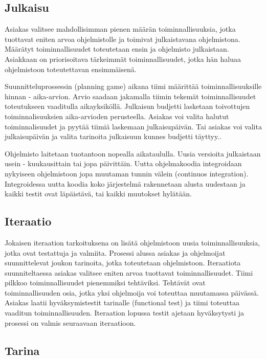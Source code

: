 \documentclass[finnish]{tktltiki2}
\theoremstyle{definition}
\theoremstyle{remark}
\begin{document}
\subsection*{Julkaisu}

Asiakas valitsee mahdollisimman pienen määrän toiminnallisuuksia, jotka tuottavat eniten arvoa ohjelmistolle ja toimivat julkaistavana ohjelmistona. Määrätyt toiminnallisuudet toteutetaan ensin ja ohjelmisto julkaistaan. Asiakkaan on priorisoitava tärkeimmät toiminnallisuudet, jotka hän haluaa ohjelmistoon toteutettavan ensimmäisenä\cite{BEC99}. 

Suunnitteluprossessin (planning game) aikana tiimi määrittää toiminnallisuuksille hinnan - aika-arvion. Arvio saadaan jakamalla tiimin tekemät toiminnallisuudet toteutukseen vaaditulla aikayksiköllä. Julkaisun budjetti lasketaan toivottujen toiminnalisuuksien aika-arvioden perusteella. Asiakas voi valita halutut toiminnalisuudet ja pyytää tiimiä laskemaan julkaisupäivän. Tai asiakas voi valita julkaisupäivän ja valita tarinoita julkaisuun kunnes budjetti täyttyy.\cite{BEC99}.

Ohjelmisto laitetaan tuotantoon nopealla aikataululla. Uusia versioita julkaistaan usein - kuukausittain tai jopa päivittäin. Uutta ohjelmakoodia integroidaan nykyiseen ohjelmistoon jopa muutaman tunnin välein (continuos integration). Integroidessa uutta koodia koko järjestelmä rakennetaan alusta uudestaan ja kaikki testit ovat läpäistävä, tai kaikki muutokset hylätään\cite{BEC99}.  


\subsection*{Iteraatio}

Jokaisen iteraation tarkoituksena on lisätä ohjelmistoon uusia toiminnallisuuksia, jotka ovat testattuja ja valmiita. Prosessi alussa asiakas ja ohjelmoijat suunnittelevat joukon tarinoita, jotka toteutetaan ohjelmistoon. Iteraatiota suunniteltaessa asiakas valitsee eniten arvoa tuottavat toiminnallisuudet. Tiimi pilkkoo toiminnallisuudet pienemmiksi tehtäviksi. Tehtävät ovat toiminnallisuuden osia, jotka yksi ohjelmoija voi toteuttaa muutamassa päivässä. Asiakas laatii hyväksymistestit tarinalle (functional test) ja tiimi toteuttaa vaaditun toiminnallisuuden. Iteraation lopussa testit ajetaan hyväksytysti ja prosessi on valmis seuraavaan iteraatioon\cite{BEC99}.

\subsection*{Tarina}
\end{document}
